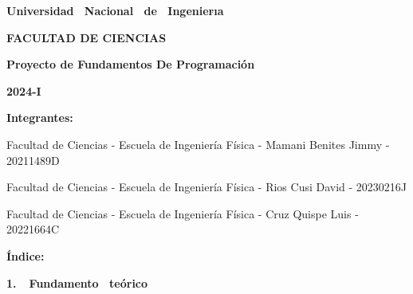 \documentclass[letterpaper]{article}
\author{Luis Angel Cruz Quispe}
\date{2024-06-25}
\begin{document}
\clearpage
\pagestyle{Standard}
{\centering{}\bfseries
Universidad \ Nacional \ de \ Ingenier$\acute{}$ıa
\par}

{\centering{}
\textbf{FACULTAD DE CIENCIAS}
\par}


\bigskip



\begin{center}
\end{center}

\bigskip


\bigskip

{\centering{}\bfseries
Proyecto de Fundamentos De Programación
\par}

{\centering{}\bfseries
2024-I
\par}


\bigskip

{
\textbf{Integrantes:}}


\bigskip

{
Facultad de Ciencias {}- Escuela de Ingeniería Física - Mamani Benites Jimmy - 20211489D\textbf{ }}

{
Facultad de Ciencias - Escuela de Ingeniería Física - Rios Cusi David - 20230216J}

{
Facultad de Ciencias - Escuela de Ingeniería Física - Cruz Quispe Luis - 20221664C}
\clearpage
\pagestyle{Convertedi}

\bigskip


\bigskip


\bigskip


\bigskip


\bigskip


\bigskip


\bigskip


\bigskip

{
\textbf{Índice:}}


\bigskip

{
\textbf{1.\ \ Fundamento \ teórico}}


\bigskip
\end{document}
